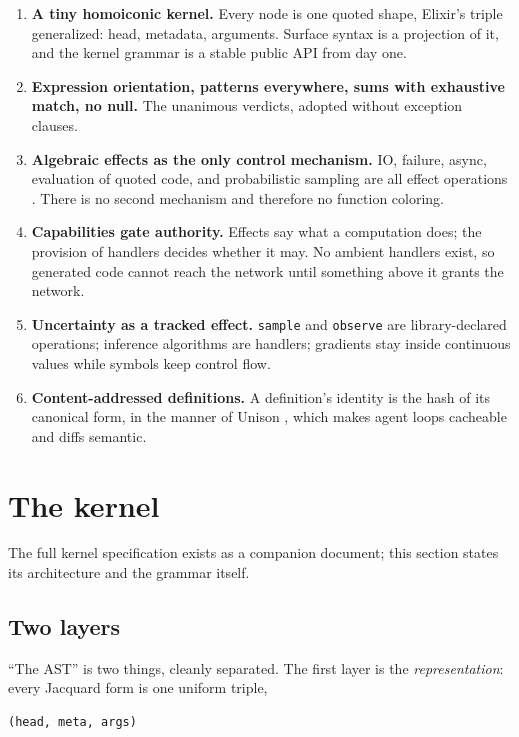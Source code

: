 \documentclass[11pt]{article}
\newcommand{\jacquard}{Jacquard}
\begin{document}
\begin{enumerate}
\item \textbf{A tiny homoiconic kernel.} Every node is one quoted shape, Elixir's triple generalized: head, metadata, arguments. Surface syntax is a projection of it, and the kernel grammar is a stable public API from day one.
\item \textbf{Expression orientation, patterns everywhere, sums with exhaustive match, no null.} The unanimous verdicts, adopted without exception clauses.
\item \textbf{Algebraic effects as the only control mechanism.} IO, failure, async, evaluation of quoted code, and probabilistic sampling are all effect operations \cite{plotkin2009}. There is no second mechanism and therefore no function coloring.
\item \textbf{Capabilities gate authority.} Effects say what a computation does; the provision of handlers decides whether it may. No ambient handlers exist, so generated code cannot reach the network until something above it grants the network.
\item \textbf{Uncertainty as a tracked effect.} \texttt{sample} and \texttt{observe} are library-declared operations; inference algorithms are handlers; gradients stay inside continuous values while symbols keep control flow.
\item \textbf{Content-addressed definitions.} A definition's identity is the hash of its canonical form, in the manner of Unison \cite{unison}, which makes agent loops cacheable and diffs semantic.
\end{enumerate}

\section{The kernel}
\label{sec:kernel}

The full kernel specification exists as a companion document; this section states its architecture and the grammar itself.

\subsection{Two layers}

``The AST'' is two things, cleanly separated. The first layer is the \emph{representation}: every \jacquard{} form is one uniform triple,

\begin{lstlisting}
(head, meta, args)
\end{lstlisting}
\end{document}
